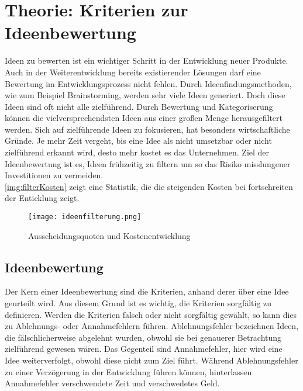 \newpage
\section{Theorie: Kriterien zur Ideenbewertung}\label{sec:theorie}
Ideen zu bewerten ist ein wichtiger Schritt in der Entwicklung neuer Produkte. 
Auch in der Weiterentwicklung bereits existierender Lösungen darf eine Bewertung im Entwicklungsprozess nicht fehlen. 
Durch Ideenfindungsmethoden, wie zum Beispiel Brainstorming, werden sehr viele Ideen generiert. Doch diese Ideen 
sind oft nicht alle zielführend. 
Durch Bewertung und Kategoriserung können die vielversprechendsten Ideen aus einer großen Menge herausgefiltert werden. 
Sich auf zielführende Ideen zu fokusieren, hat besonders wirtschaftliche Gründe.
Je mehr Zeit vergeht, bis eine Idee als nicht umsetzbar oder nicht zielführend erkannt wird, desto mehr kostet es das Unternehmen.
Ziel der Ideenbewertung ist es, Ideen frühzeitig zu filtern um so das Risiko misslungener Investitionen zu vermeiden.
\cite{grossklaus:2008}\\
\autoref{img:filterKosten} zeigt eine Statistik, die die steigenden Kosten bei fortschreiten der Enticklung zeigt. 
\begin{figure}[h]
	\centering
	\texttt{[image: ideenfilterung.png]}
	\caption{Ausscheidungsquoten und Kostenentwicklung}
	\label{img:filterKosten}
\end{figure}

\subsection{Ideenbewertung}
Der Kern einer Ideenbewertung sind die Kriterien, anhand derer über eine Idee geurteilt wird.
Aus diesem Grund ist es wichtig, die Kriterien sorgfältig zu definieren. Werden die Kriterien falsch oder nicht sorgfältig gewählt,
so kann dies zu Ablehnungs- oder Annahmefehlern führen. 
Ablehnungsfehler bezeichnen Ideen, die fälschlicherweise abgelehnt wurden, obwohl sie bei genauerer Betrachtung 
zielführend gewesen wären. Das Gegenteil sind Annahmefehler, hier wird eine Idee weiterverfolgt, obwohl diese nicht zum Ziel führt. 
Während Ablehnungsfehler zu einer Verzögerung in der Entwicklung führen können, hinterlassen Annahmefehler verschwendete Zeit und verschwedetes Geld.\\

